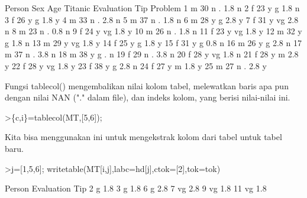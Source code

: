 \documentclass[a4paper,10pt]{article}
\begin{document}
\begin{eulernotebook}
\begin{eulercomment}
\begin{eulercomment}
\begin{eulerprompt}
\end{eulerprompt}
\begin{euleroutput}
   Person  Sex  Age Titanic Evaluation  Tip Problem
        1    m   30       n          .  1.8       n
        2    f   23       y          g  1.8       n
        3    f   26       y          g  1.8       y
        4    m   33       n          .  2.8       n
        5    m   37       n          .  1.8       n
        6    m   28       y          g  2.8       y
        7    f   31       y         vg  2.8       n
        8    m   23       n          .  0.8       n
        9    f   24       y         vg  1.8       y
       10    m   26       n          .  1.8       n
       11    f   23       y         vg  1.8       y
       12    m   32       y          g  1.8       n
       13    m   29       y         vg  1.8       y
       14    f   25       y          g  1.8       y
       15    f   31       y          g  0.8       n
       16    m   26       y          g  2.8       n
       17    m   37       n          .  3.8       n
       18    m   38       y          g    .       n
       19    f   29       n          .  3.8       n
       20    f   28       y         vg  1.8       n
       21    f   28       y          m  2.8       y
       22    f   28       y         vg  1.8       y
       23    f   38       y          g  2.8       n
       24    f   27       y          m  1.8       y
       25    m   27       n          .  2.8       y
\end{euleroutput}
\begin{eulercomment}
Fungsi tablecol() mengembalikan nilai kolom tabel, melewatkan baris
apa pun dengan nilai NAN ("." dalam file), dan indeks kolom, yang
berisi nilai-nilai ini.
\end{eulercomment}
\begin{eulerprompt}
>\{c,i\}=tablecol(MT,[5,6]);
\end{eulerprompt}
\begin{eulercomment}
Kita bisa menggunakan ini untuk mengekstrak kolom dari tabel untuk
tabel baru.
\end{eulercomment}
\begin{eulerprompt}
>j=[1,5,6]; writetable(MT[i,j],labc=hd[j],ctok=[2],tok=tok)
\end{eulerprompt}
\begin{euleroutput}
      Person Evaluation       Tip
           2          g       1.8
           3          g       1.8
           6          g       2.8
           7         vg       2.8
           9         vg       1.8
          11         vg       1.8

\end{euleroutput}
\end{eulercomment}
\end{eulercomment}
\end{eulernotebook}
\end{document}
